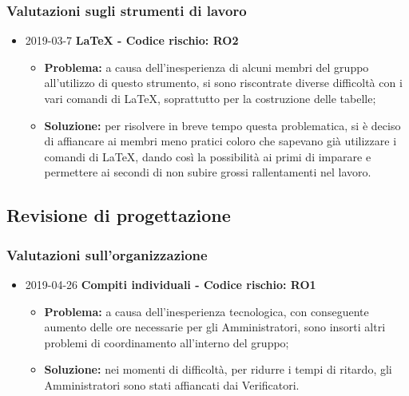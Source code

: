 \subsubsection{Valutazioni sugli strumenti di lavoro}
\begin{itemize}
				
		\item 2019-03-7 \textbf{\LaTeX{} - Codice rischio: RO2} \\
		\begin{itemize}
			\item \textbf{Problema:} a causa dell'inesperienza di alcuni membri del gruppo all'utilizzo di questo strumento, si sono riscontrate diverse difficoltà con i vari comandi di \LaTeX{}, soprattutto per la costruzione delle tabelle;
			\item \textbf{Soluzione:} per risolvere in breve tempo questa problematica, si è deciso di affiancare
		ai membri meno pratici coloro che sapevano già utilizzare i comandi di \LaTeX{}, dando
		così la possibilità ai primi di imparare e permettere ai secondi di non 
		subire grossi rallentamenti nel lavoro.
		\end{itemize}		
		
\end{itemize}

\subsection{Revisione di progettazione}

\subsubsection{Valutazioni sull'organizzazione}
\begin{itemize}	
		\item 2019-04-26 \textbf{Compiti individuali - Codice rischio: RO1} \\
		\begin{itemize}
			\item \textbf{Problema:} a causa dell'inesperienza tecnologica, con conseguente aumento delle ore necessarie per gli Amministratori, sono insorti altri problemi di coordinamento all'interno del gruppo;
			\item \textbf{Soluzione:} nei momenti di difficoltà, per ridurre i tempi di ritardo, gli Amministratori sono stati affiancati dai Verificatori.
		\end{itemize}
	
\end{itemize}

